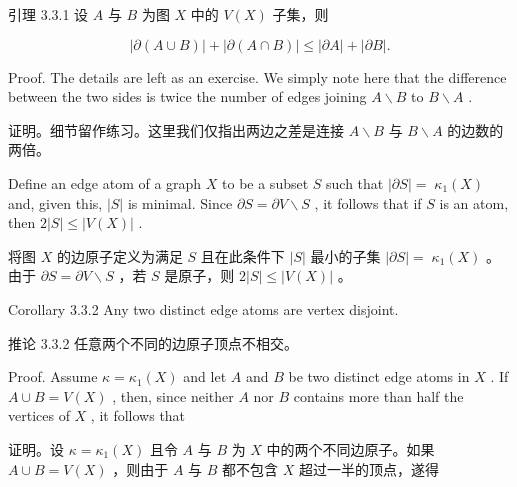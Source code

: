 \documentclass[10pt]{article}
\begin{document}
\begin{tcolorbox}\relax
引理 3.3.1 设 \(A\) 与 \(B\) 为图 \(X\) 中的 \(V\left( X\right)\) 子集，则
\end{tcolorbox}

\[
\left| {\partial \left( {A \cup  B}\right) }\right|  + \left| {\partial \left( {A \cap  B}\right) }\right|  \leq  \left| {\partial A}\right|  + \left| {\partial B}\right| .
\]

Proof. The details are left as an exercise. We simply note here that the difference between the two sides is twice the number of edges joining \(A \smallsetminus  B\) to \(B \smallsetminus  A\) .

\begin{tcolorbox}\relax
证明。细节留作练习。这里我们仅指出两边之差是连接 \(A \smallsetminus  B\) 与 \(B \smallsetminus  A\) 的边数的两倍。
\end{tcolorbox}

Define an edge atom of a graph \(X\) to be a subset \(S\) such that \(\left| {\partial S}\right|  = \; {\kappa }_{1}\left( X\right)\) and, given this, \(\left| S\right|\) is minimal. Since \(\partial S = \partial V \smallsetminus  S\) , it follows that if \(S\) is an atom, then \(2\left| S\right|  \leq  \left| {V\left( X\right) }\right|\) .

\begin{tcolorbox}\relax
将图 \(X\) 的边原子定义为满足 \(S\) 且在此条件下 \(\left| S\right|\) 最小的子集 \(\left| {\partial S}\right|  = \; {\kappa }_{1}\left( X\right)\) 。由于 \(\partial S = \partial V \smallsetminus  S\) ，若 \(S\) 是原子，则 \(2\left| S\right|  \leq  \left| {V\left( X\right) }\right|\) 。
\end{tcolorbox}

Corollary 3.3.2 Any two distinct edge atoms are vertex disjoint.

\begin{tcolorbox}\relax
推论 3.3.2 任意两个不同的边原子顶点不相交。
\end{tcolorbox}

Proof. Assume \(\kappa  = {\kappa }_{1}\left( X\right)\) and let \(A\) and \(B\) be two distinct edge atoms in \(X\) . If \(A \cup  B = V\left( X\right)\) , then, since neither \(A\) nor \(B\) contains more than half the vertices of \(X\) , it follows that

\begin{tcolorbox}\relax
证明。设 \(\kappa  = {\kappa }_{1}\left( X\right)\) 且令 \(A\) 与 \(B\) 为 \(X\) 中的两个不同边原子。如果 \(A \cup  B = V\left( X\right)\) ，则由于 \(A\) 与 \(B\) 都不包含 \(X\) 超过一半的顶点，遂得
\end{tcolorbox}
\end{document}
